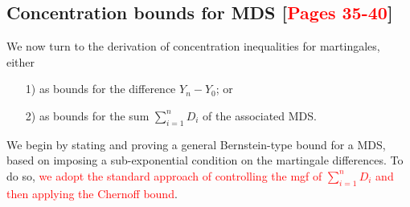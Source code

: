 \documentclass[10pt,handout,english]{beamer}
\newcommand{\1}{\mathbbm{1}}
\begin{document}
\subsection{Concentration bounds for MDS [\textcolor{red}{Pages 35-40}]}
\begin{frame}[allowframebreaks]
We now turn to the derivation of concentration inequalities for martingales, either
\begin{itemize}
\item[1)] as bounds for the difference $Y_n-Y_0$; or
\item[2)] as bounds for the sum $\sum_{i=1}^nD_i$ of the associated MDS.
\end{itemize}
We begin by stating and proving a general Bernstein-type bound for a MDS, based on imposing a sub-exponential condition on the martingale differences. To do so, \textcolor{red}{we adopt the standard approach of controlling the mgf of $\sum_{i=1}^{n}D_i$ and then applying the Chernoff bound}. 



\end{frame}
\end{document}
